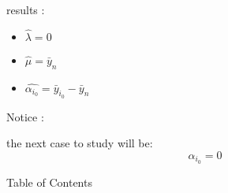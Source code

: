\documentclass[unknownkeysallowed]{beamer}
\begin{document}
\begin{frame}

\begin{alertblock}{results : }
    \begin{itemize}
        \item $\hat{\lambda}=0$
        \item $\hat{\mu}=\bar{y}_n$
        \item $\hat{\alpha_{i_0}}=\bar{y}_{i_0}- \bar{y}_{n}$
       
    \end{itemize}


\end{alertblock}


\begin{alertblock}{Notice : }

the next case to study will be: $$ \alpha_{i_0}=0$$

\end{alertblock}

\end{frame}









\begin{frame}{Table of Contents}
\tableofcontents[hideallsubsections]
\end{frame}







\end{document}
